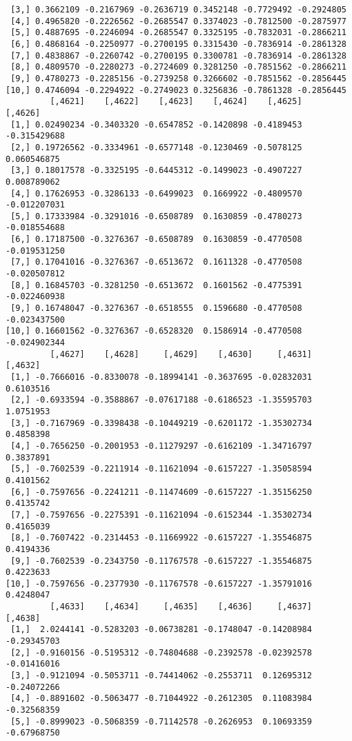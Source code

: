 \documentclass[
  letterpaper,
  DIV=11,
  numbers=noendperiod]{scrreprt}
\begin{document}
\begin{verbatim}
 [3,] 0.3662109 -0.2167969 -0.2636719 0.3452148 -0.7729492 -0.2924805
 [4,] 0.4965820 -0.2226562 -0.2685547 0.3374023 -0.7812500 -0.2875977
 [5,] 0.4887695 -0.2246094 -0.2685547 0.3325195 -0.7832031 -0.2866211
 [6,] 0.4868164 -0.2250977 -0.2700195 0.3315430 -0.7836914 -0.2861328
 [7,] 0.4838867 -0.2260742 -0.2700195 0.3300781 -0.7836914 -0.2861328
 [8,] 0.4809570 -0.2280273 -0.2724609 0.3281250 -0.7851562 -0.2866211
 [9,] 0.4780273 -0.2285156 -0.2739258 0.3266602 -0.7851562 -0.2856445
[10,] 0.4746094 -0.2294922 -0.2749023 0.3256836 -0.7861328 -0.2856445
         [,4621]    [,4622]    [,4623]    [,4624]    [,4625]      [,4626]
 [1,] 0.02490234 -0.3403320 -0.6547852 -0.1420898 -0.4189453 -0.315429688
 [2,] 0.19726562 -0.3334961 -0.6577148 -0.1230469 -0.5078125  0.060546875
 [3,] 0.18017578 -0.3325195 -0.6445312 -0.1499023 -0.4907227  0.008789062
 [4,] 0.17626953 -0.3286133 -0.6499023  0.1669922 -0.4809570 -0.012207031
 [5,] 0.17333984 -0.3291016 -0.6508789  0.1630859 -0.4780273 -0.018554688
 [6,] 0.17187500 -0.3276367 -0.6508789  0.1630859 -0.4770508 -0.019531250
 [7,] 0.17041016 -0.3276367 -0.6513672  0.1611328 -0.4770508 -0.020507812
 [8,] 0.16845703 -0.3281250 -0.6513672  0.1601562 -0.4775391 -0.022460938
 [9,] 0.16748047 -0.3276367 -0.6518555  0.1596680 -0.4770508 -0.023437500
[10,] 0.16601562 -0.3276367 -0.6528320  0.1586914 -0.4770508 -0.024902344
         [,4627]    [,4628]     [,4629]    [,4630]     [,4631]   [,4632]
 [1,] -0.7666016 -0.8330078 -0.18994141 -0.3637695 -0.02832031 0.6103516
 [2,] -0.6933594 -0.3588867 -0.07617188 -0.6186523 -1.35595703 1.0751953
 [3,] -0.7167969 -0.3398438 -0.10449219 -0.6201172 -1.35302734 0.4858398
 [4,] -0.7656250 -0.2001953 -0.11279297 -0.6162109 -1.34716797 0.3837891
 [5,] -0.7602539 -0.2211914 -0.11621094 -0.6157227 -1.35058594 0.4101562
 [6,] -0.7597656 -0.2241211 -0.11474609 -0.6157227 -1.35156250 0.4135742
 [7,] -0.7597656 -0.2275391 -0.11621094 -0.6152344 -1.35302734 0.4165039
 [8,] -0.7607422 -0.2314453 -0.11669922 -0.6157227 -1.35546875 0.4194336
 [9,] -0.7602539 -0.2343750 -0.11767578 -0.6157227 -1.35546875 0.4223633
[10,] -0.7597656 -0.2377930 -0.11767578 -0.6157227 -1.35791016 0.4248047
         [,4633]    [,4634]     [,4635]    [,4636]     [,4637]     [,4638]
 [1,]  2.0244141 -0.5283203 -0.06738281 -0.1748047 -0.14208984 -0.29345703
 [2,] -0.9160156 -0.5195312 -0.74804688 -0.2392578 -0.02392578 -0.01416016
 [3,] -0.9121094 -0.5053711 -0.74414062 -0.2553711  0.12695312 -0.24072266
 [4,] -0.8891602 -0.5063477 -0.71044922 -0.2612305  0.11083984 -0.32568359
 [5,] -0.8999023 -0.5068359 -0.71142578 -0.2626953  0.10693359 -0.67968750

\end{verbatim}
\end{document}
